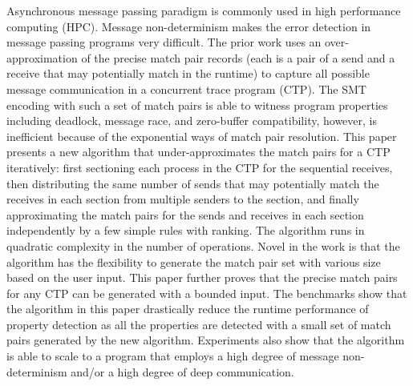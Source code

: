 Asynchronous message passing paradigm is commonly used in high performance computing (HPC).
Message non-determinism makes the error detection in message passing programs very difficult. The prior work uses an over-approximation of the precise match pair records (each is a pair of a send and a receive that may potentially match in the runtime) to capture all possible message communication in a concurrent trace program (CTP). The SMT encoding with such a set of match pairs is able to witness program properties including deadlock, message race, and zero-buffer compatibility, however, is inefficient because of the exponential ways of match pair resolution.
This paper presents a new algorithm that under-approximates the match pairs for a CTP iteratively: first sectioning each process in the CTP for the sequential receives, then distributing the same number of sends that may potentially match the receives in each section from multiple senders to the section, and finally approximating the match pairs for the sends and receives in each section independently by a few simple rules with ranking. The algorithm runs in quadratic complexity in the number of operations. Novel in the work is that the algorithm has the flexibility to generate the match pair set with various size based on the user input. This paper further proves that the precise match pairs for any CTP can be generated with a bounded input. The benchmarks show that the algorithm in this paper drastically reduce the runtime performance of property detection as all the properties are detected with a small set of match pairs generated by the new algorithm. Experiments also show that the algorithm is able to scale to a program that employs a high degree of message non-determinism and/or a high degree of deep communication.